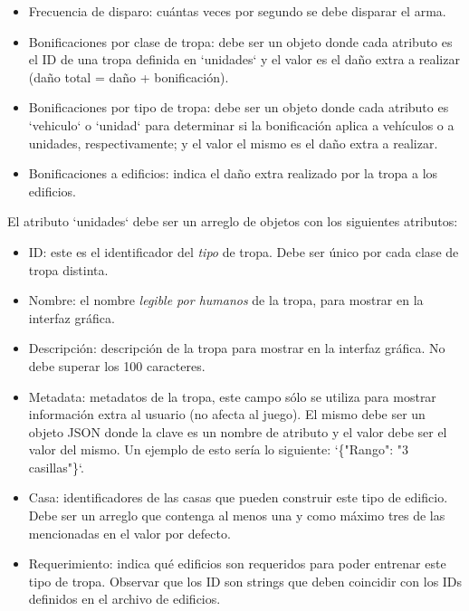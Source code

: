 \documentclass[titlepage,a4paper,12pt]{article}
\begin{document}
\begin{itemize}
\begin{itemize}
\item Frecuencia de disparo: cuántas veces por segundo se debe disparar el arma.

\item Bonificaciones por clase de tropa: debe ser un objeto donde cada atributo es el ID de una tropa definida en `unidades` y el valor es el daño extra a realizar (daño total = daño + bonificación).

\item Bonificaciones por tipo de tropa: debe ser un objeto donde cada atributo es `vehiculo` o `unidad` para determinar si la bonificación aplica a vehículos o a unidades, respectivamente; y el valor el mismo es el daño extra a realizar.

\item Bonificaciones a edificios: indica el daño extra realizado por la tropa a los edificios.

\end{itemize}

El atributo `unidades` debe ser un arreglo de objetos con los siguientes atributos:  

\begin{itemize}

\item ID: este es el identificador del \textit{tipo} de tropa. Debe ser único por cada clase de tropa distinta.

\item Nombre: el nombre \textit{legible por humanos} de la tropa, para mostrar en la interfaz gráfica.

\item Descripción: descripción de la tropa para mostrar en la interfaz gráfica. No debe superar los 100 caracteres.

\item Metadata: metadatos de la tropa, este campo sólo se utiliza para mostrar información extra al usuario (no afecta al juego). El mismo debe ser un objeto JSON donde la clave es un nombre de atributo y el valor debe ser el valor del mismo. Un ejemplo de esto sería lo siguiente: `\{"Rango": "3 casillas"\}`.

\item Casa: identificadores de las casas que pueden construir este tipo de edificio. Debe ser un arreglo que contenga al menos una y como máximo tres de las mencionadas en el valor por defecto. 

\item Requerimiento: indica qué edificios son requeridos para poder entrenar este tipo de tropa. Observar que los ID son strings que deben coincidir con los IDs definidos en el archivo de edificios.


\end{itemize}
\end{itemize}
\end{document}
